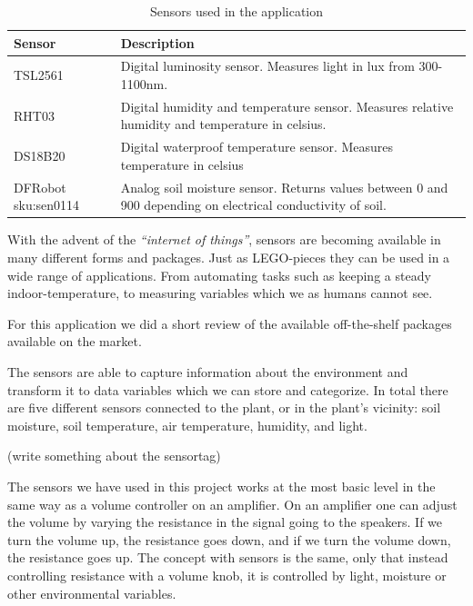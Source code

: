 \def\arraystretch{1.8}
\begin{table}
    \begin{tabular}{@{}lp{250pt}@{}}\toprule
    Sensor               & Description \\ \midrule                                                                                                  
    TSL2561              & Digital luminosity sensor. Measures light in lux from 300-1100nm.                                            \\ 
    RHT03                & Digital humidity and temperature sensor. Measures relative humidity and temperature in celsius.              \\ 
    DS18B20              & Digital waterproof temperature sensor. Measures temperature in celsius                                       \\ 
    DFRobot sku:sen0114  & Analog soil moisture sensor. Returns values between 0 and 900 depending on electrical conductivity of soil.  \\ \bottomrule
    \end{tabular}
    \caption{Sensors used in the application}
\end{table}


With the advent of the \emph{“internet of things”}, sensors are becoming available in many different forms and packages. Just as LEGO-pieces they can be used in a wide range of applications. From automating tasks such as keeping a steady indoor-temperature, to measuring variables which we as humans cannot see. 

For this application we did a short review of the available off-the-shelf packages available on the market. 

The sensors are able to capture information about the environment and transform it to data variables which we can store and categorize. In total there are five different sensors connected to the plant, or in the plant’s vicinity: soil moisture, soil temperature, air temperature, humidity, and light. 


(write something about the sensortag)

The sensors we have used in this project works at the most basic level in the same way as a volume controller on an amplifier. On an amplifier one can adjust the volume by varying the resistance in the signal going to the speakers. If we turn the volume up, the resistance goes down, and if we turn the volume down, the resistance goes up. The concept with sensors is the same, only that instead controlling resistance with a volume knob, it is controlled by light, moisture or other environmental variables. 

